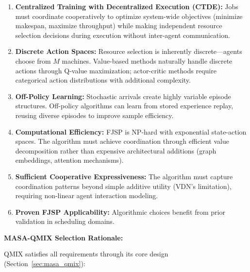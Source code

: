 \begin{enumerate}
\item \textbf{Centralized Training with Decentralized Execution (CTDE):} Jobs must coordinate cooperatively to optimize system-wide objectives (minimize makespan, maximize throughput) while making independent resource selection decisions during execution without inter-agent communication.

\item \textbf{Discrete Action Spaces:} Resource selection is inherently discrete—agents choose from \( M \) machines. Value-based methods naturally handle discrete actions through Q-value maximization; actor-critic methods require categorical action distributions with additional complexity.

\item \textbf{Off-Policy Learning:} Stochastic arrivals create highly variable episode structures. Off-policy algorithms can learn from stored experience replay, reusing diverse episodes to improve sample efficiency.

\item \textbf{Computational Efficiency:} FJSP is NP-hard with exponential state-action spaces. The algorithm must achieve coordination through efficient value decomposition rather than expensive architectural additions (graph embeddings, attention mechanisms).

\item \textbf{Sufficient Cooperative Expressiveness:} The algorithm must capture coordination patterns beyond simple additive utility (VDN's limitation), requiring non-linear agent interaction modeling.

\item \textbf{Proven FJSP Applicability:} Algorithmic choices benefit from prior validation in scheduling domains.
\end{enumerate}

\textbf{MASA-QMIX Selection Rationale:}

QMIX satisfies all requirements through its core design (Section~\ref{sec:masa_qmix}):

